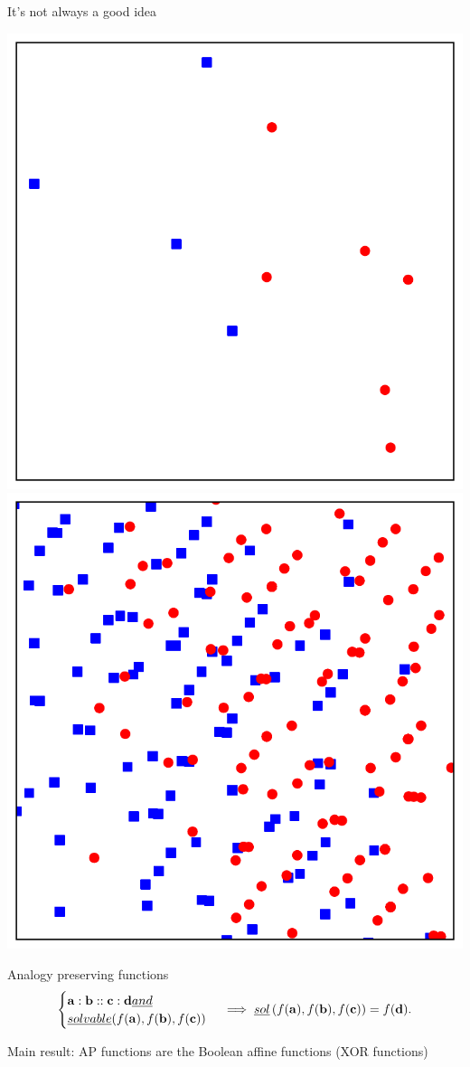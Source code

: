 \documentclass{beamer}
\begin{document}
\begin{frame}{It's not always a good idea}
  \begin{center}
    \includegraphics[width=.5\textwidth]{figures/AE_in_R2_S.pdf}
    \includegraphics[width=.5\textwidth]{figures/AE_in_R2_AE.pdf}
  \end{center}
\end{frame}

\begin{frame}{Analogy preserving functions}
  $$
  \begin{cases}
    \mathbf{a} :  \mathbf{b} ::  \mathbf{c} :  \mathbf{d} \emph{ and }\\
    \emph{solvable}(f(\mathbf{a}), f(\mathbf{b}),  f(\mathbf{c}))
  \end{cases}
  \implies \emph{sol}\left(f(\mathbf{a}),  f(\mathbf{b}),  f(\mathbf{c})\right) =
  f(\mathbf{d}). $$

  \alert{Main result}: AP functions are the Boolean affine functions (XOR
  functions)
\end{frame}
\end{document}
